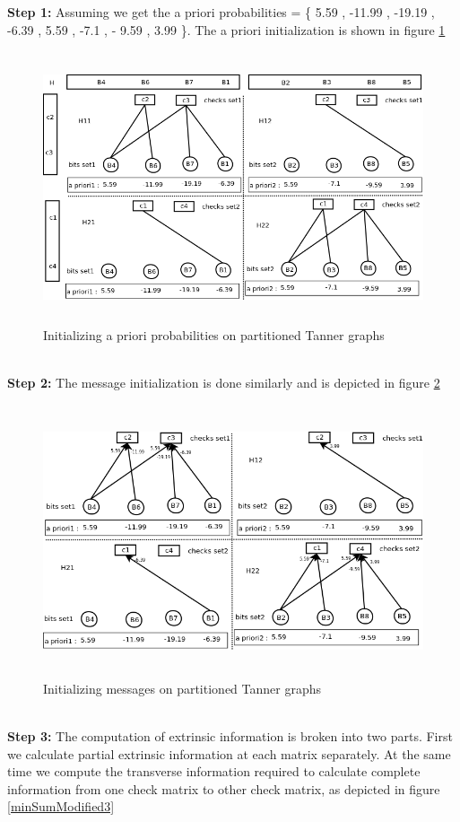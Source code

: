 \textbf{Step 1:} 
Assuming we get the a priori probabilities = \{ 5.59 , -11.99 , -19.19 , -6.39 , 5.59 , -7.1 , - 9.59 , 3.99 \}. The a priori initialization is shown in figure \ref{minSumModified1}
\begin{figure}[h!]
\centering
\includegraphics[height=8cm,width=12cm]{minSumModified1}
\caption[Initialization of a priori probabilities on  partitioned Tanner graphs]{Initializing a priori probabilities on partitioned Tanner graphs}
\label{minSumModified1}
\end{figure}
\\
\textbf{Step 2:}
The message initialization is done similarly and is  depicted in figure \ref{minSumModified2}
\begin{figure}[h!]
\centering
\includegraphics[height=8cm,width=12cm]{minSumModified2}
\caption[Initialization of messages on  partitioned Tanner graphs]{Initializing messages on  partitioned Tanner graphs}
\label{minSumModified2}
\end{figure}
\\
\textbf{Step 3:}
The computation of extrinsic information is broken into two parts. First we calculate partial extrinsic information at each matrix separately. At the same time we compute the transverse information required to calculate complete information from one check matrix to other check matrix, as depicted in figure  \ref{minSumModified3}

